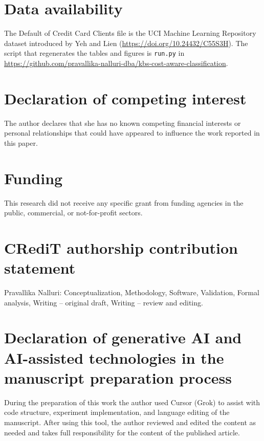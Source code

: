\documentclass[12pt]{article}
\begin{document}
\begin{singlespace}
\section*{Data availability}
The Default of Credit Card Clients file is the UCI Machine Learning Repository dataset introduced by Yeh and Lien \cite{yeh2009,yehdata} (\url{https://doi.org/10.24432/C55S3H}). The script that regenerates the tables and figures is \texttt{run.py} in \url{https://github.com/pravallika-nalluri-dba/kbs-cost-aware-classification}.

\section*{Declaration of competing interest}
The author declares that she has no known competing financial interests or personal relationships that could have appeared to influence the work reported in this paper.

\section*{Funding}
This research did not receive any specific grant from funding agencies in the public, commercial, or not-for-profit sectors.

\section*{CRediT authorship contribution statement}
Pravallika Nalluri: Conceptualization, Methodology, Software, Validation, Formal analysis, Writing -- original draft, Writing -- review and editing.

\section*{Declaration of generative AI and AI-assisted technologies in the manuscript preparation process}
During the preparation of this work the author used Cursor (Grok) to assist with code structure, experiment implementation, and language editing of the manuscript. After using this tool, the author reviewed and edited the content as needed and takes full responsibility for the content of the published article.


\end{singlespace}
\end{document}
